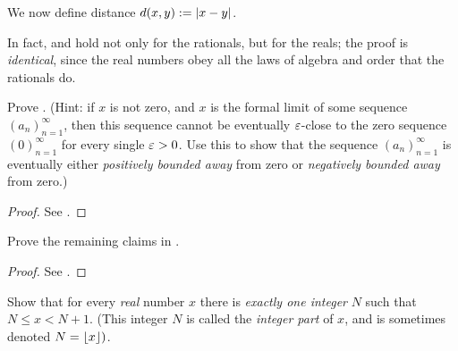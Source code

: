 \begin{definition}  \label{def 5.4.16}
We now define distance \(d(x, y) := \lvert x - y\rvert\).
\end{definition}

\begin{proposition} \label{prop 5.4.17}
In fact,  and  hold not only for the rationals, but for the reals;
the proof is \emph{identical}, since the real numbers obey all the laws of algebra and order that the rationals do.
\end{proposition}

\exercisesection

\begin{exercise} \label{exercise 5.4.1}
Prove .
(Hint: if \(x\) is not zero, and \(x\) is the formal limit of some sequence \((a_n)_{n = 1}^{\infty}\), then this sequence cannot be eventually \(\varepsilon\)-close to the zero sequence \((0)_{n = 1}^{\infty}\) for every single \(\varepsilon > 0\).
Use this to show that the sequence \((a_n)_{n = 1}^{\infty}\) is eventually either \emph{positively bounded away} from zero or \emph{negatively bounded away} from zero.)
\end{exercise}

\begin{proof}
See .
\end{proof}

\begin{exercise} \label{exercise 5.4.2}
Prove the remaining claims in .
\end{exercise}

\begin{proof}
See .
\end{proof}

\begin{exercise} \label{exercise 5.4.3}
Show that for every \emph{real} number \(x\) there is \emph{exactly one integer} \(N\) such that \(N \le x < N + 1\).
(This integer \(N\) is called the \emph{integer part} of \(x\), and is sometimes denoted \(N = \lfloor{x}\rfloor)\).
\end{exercise}

